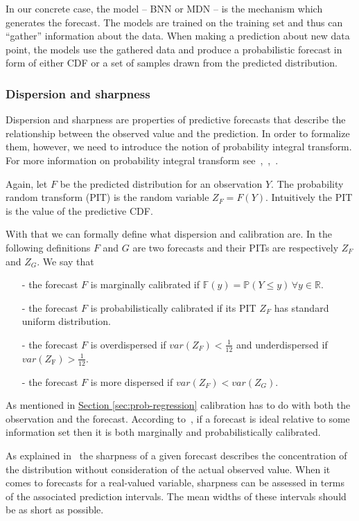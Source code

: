 \documentclass[12pt,a4paper,twoside]{scrartcl}
\numberwithin{equation}{section}
\newcommand{\refsec}[1]{\hyperref[#1]{Section \ref*{#1}}}
\begin{document}
In our concrete case, the model -- BNN or MDN -- is the mechanism which generates the forecast. The models are trained on the training set and thus can ``gather'' information about the data. When making a prediction about new data point, the models use the gathered data and produce a probabilistic forecast in form of either CDF or a set of samples drawn from the predicted distribution.
\subsubsection{Dispersion and sharpness}\label{sec:disp-sharp}
Dispersion and sharpness are properties of predictive forecasts that describe the relationship between the observed value and the prediction. In order to formalize them, however, we need to introduce the notion of probability integral transform. For more information on probability integral transform see~\cite{diebold1998},~\cite{gneiting2007},~\cite{dawid84}.

Again, let \(F\) be the predicted distribution for an observation \(Y\). The probability random transform (PIT) is the random variable \(Z_F=F(Y)\). Intuitively the PIT is the value of the predictive CDF.\@

With that we can formally define what dispersion and calibration are. In the following definitions \(F\) and \(G\) are two forecasts and their PITs are respectively \(Z_F\) and \(Z_G\). We say that
\begin{itemize}
\item[-] the forecast \(F\) is marginally calibrated if \(\mathbb{F}(y) = \mathbb{P}(Y \leq y)\, \forall y\in\mathbb{R}\).
\item[-] the forecast \(F\) is probabilistically calibrated if its PIT \(Z_F\) has standard uniform distribution.
\item[-] the forecast \(F\) is overdispersed if \(var(Z_F) < \frac{1}{12}\) and underdispersed if \(var(Z_{\text{F}}) > \frac{1}{12} \).
\item[-] the forecast \(F\) is more dispersed if \(var(Z_F) < var(Z_G)\).
\end{itemize}

As mentioned in \refsec{sec:prob-regression} calibration has to do with both the observation and the forecast. According to~\cite{gneiting2014}, if a forecast is ideal relative to some information set then it is both marginally and probabilistically calibrated.

As explained in~\cite{gneiting2014} the sharpness of a given forecast describes the concentration of the distribution without consideration of the actual observed value. When it comes to forecasts for a real-valued variable, sharpness can be assessed in terms of the associated prediction intervals. The mean widths of these intervals should be as short as possible. 
\end{document}
